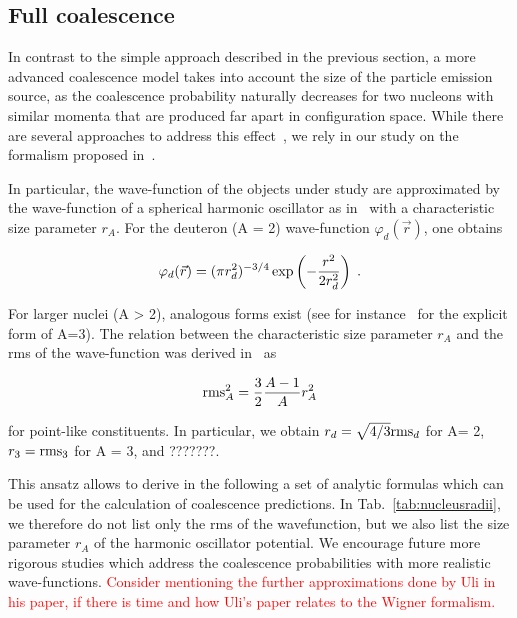 \documentclass[a4paper,11pt]{scrartcl} %
\begin{document}
\subsection{Full coalescence}
\label{subsec:FullCoalescence}

In contrast to the simple approach described in the previous section, a more advanced coalescence model takes into account the size of the particle emission source, as the coalescence probability naturally decreases for two nucleons with similar momenta that are produced far apart in configuration space. While there are several approaches to address this effect~\cite{PapersWithWignerCitedinUli}, we rely in our study on the formalism proposed in~\cite{Scheibl:1998tk}. 

In particular, the wave-function of the objects under study are approximated by the wave-function of a spherical harmonic oscillator as in~\cite{Scheibl:1998tk} with a characteristic size parameter $r_{A}$. For the deuteron (A = 2) wave-function $\varphi_{d}(\vec{r}) $, one obtains

\begin{equation}
 \varphi_{d}(\vec{r}) = (\pi r_{d}^2)^{-3/4} \exp\left(-{r^2 \over 2 r_{d}^2}\right) \;.
\end{equation}

\noindent For larger nuclei (A > 2), analogous forms exist (see for instance~\cite{Scheibl:1998tk} for the explicit form of A=3). The relation between the characteristic size parameter $r_{A}$ and the rms of the wave-function was derived in~\cite{Shebeko:2006ud} as

\begin{equation}
 {\rm rms}_{A}^2 = {3 \over 2}{A - 1 \over A} r_{A}^2
\end{equation}

\noindent for point-like constituents. In particular, we obtain $r_{d}=\sqrt{4/3}{\rm rms}_{d}$ for A= 2, $r_{3}= {\rm rms}_{3}$ for A = 3, and ???????.

This ansatz allows to derive in the following a set of analytic formulas which can be used for the calculation of coalescence predictions. In Tab.~\ref{tab:nucleusradii}, we therefore do not list only the rms of the wavefunction, but we also list the size parameter $r_{A}$ of the harmonic oscillator potential. We encourage future more rigorous studies which address the coalescence probabilities with more realistic wave-functions. \textcolor{red}{Consider mentioning the further  approximations done by Uli in his paper, if there is time and how Uli's paper relates to the Wigner formalism.}
\end{document}
